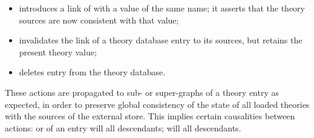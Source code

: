 \begin{isabellebody}
\begin{isamarkuptext}
  \begin{itemize}

  \item {} introduces a link of  with a
   value of the same name; it asserts that the theory
  sources are now consistent with that value;

  \item {} invalidates the link of a theory database
  entry to its sources, but retains the present theory value;

  \item {} deletes entry  from the theory
  database.
  
  \end{itemize}

  These actions are propagated to sub- or super-graphs of a theory
  entry as expected, in order to preserve global consistency of the
  state of all loaded theories with the sources of the external store.
  This implies certain causalities between actions: 
  or  of an entry will  all
  descendants;  will  all descendants.


\end{isamarkuptext}
\end{isabellebody}
